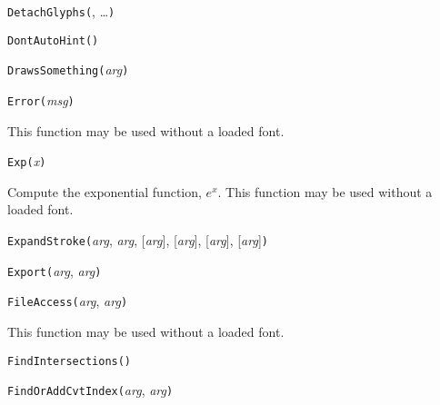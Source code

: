 

\texttt{DetachGlyphs(}, \ldots\texttt{)}



\texttt{DontAutoHint(}\texttt{)}



\texttt{DrawsSomething(}\textit{arg}\texttt{)}



\texttt{Error(}\textit{msg}\texttt{)}

This function may be used without a loaded font.



\texttt{Exp(}\textit{x}\texttt{)}

Compute the exponential function, $e^x$.
This function may be used without a loaded font.



\texttt{ExpandStroke(}\textit{arg}, \textit{arg}, [\textit{arg}], [\textit{arg}], [\textit{arg}], [\textit{arg}]\texttt{)}



\texttt{Export(}\textit{arg}, \textit{arg}\texttt{)}



\texttt{FileAccess(}\textit{arg}, \textit{arg}\texttt{)}

This function may be used without a loaded font.



\texttt{FindIntersections(}\texttt{)}



\texttt{FindOrAddCvtIndex(}\textit{arg}, \textit{arg}\texttt{)}


